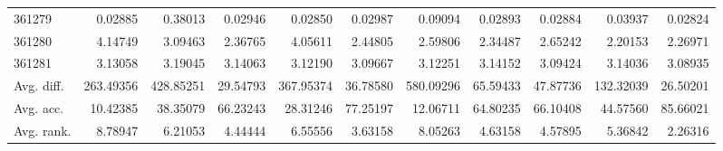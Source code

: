 \begin{tabular}{lrrrrrrrrrr}
361279 & 0.02885 & 0.38013 & 0.02946 & 0.02850 & 0.02987 & 0.09094 & 0.02893 & 0.02884 & 0.03937 & 0.02824 \\
361280 & 4.14749 & 3.09463 & 2.36765 & 4.05611 & 2.44805 & 2.59806 & 2.34487 & 2.65242 & 2.20153 & 2.26971 \\
361281 & 3.13058 & 3.19045 & 3.14063 & 3.12190 & 3.09667 & 3.12251 & 3.14152 & 3.09424 & 3.14036 & 3.08935 \\
Avg. diff. & 263.49356 & 428.85251 & 29.54793 & 367.95374 & 36.78580 & 580.09296 & 65.59433 & 47.87736 & 132.32039 & 26.50201 \\
Avg. acc. & 10.42385 & 38.35079 & 66.23243 & 28.31246 & 77.25197 & 12.06711 & 64.80235 & 66.10408 & 44.57560 & 85.66021 \\
Avg. rank. & 8.78947 & 6.21053 & 4.44444 & 6.55556 & 3.63158 & 8.05263 & 4.63158 & 4.57895 & 5.36842 & 2.26316 \\
\bottomrule
\end{tabular}

